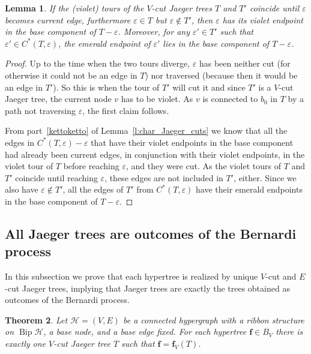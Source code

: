 \documentclass[10pt]{amsart}
\newtheorem{theo}{Theorem}[section]
\newtheorem{lemma}[theo]{Lemma}
\theoremstyle{definition}\newtheorem{defi}[theo]{Definition}
\theoremstyle{remark}\newtheorem{rema}[theo]{Remark}
\newcommand{\HH}{\mathcal H}
\DeclareMathOperator{\bip}{Bip}
\begin{document}
\begin{lemma} \label{l:subs_trees_cuts}
If the (violet) tours of the $V$-cut Jaeger trees $T$ and $T'$ coincide until $\varepsilon$ becomes current edge, furthermore $\varepsilon\in T$ but $\varepsilon\notin T'$, then $\varepsilon$ has its violet endpoint in the base component of $T-\varepsilon$. Moreover, for any $\varepsilon'\in T'$ such that $\varepsilon'\in C^*(T,\varepsilon)$, the emerald endpoint of $\varepsilon'$ lies in the base component of $T-\varepsilon$.	
\end{lemma}

\begin{proof}
Up to the time when the two tours diverge, $\varepsilon$ has been neither cut (for otherwise it could not be an edge in $T$) nor traversed (because then it would be an edge in $T'$). So this is when the tour of $T'$ will cut it and since $T'$ is a $V$-cut Jaeger tree, the current node $v$ has to be violet. As $v$ is connected to $b_0$ in $T$ by a path not traversing $\varepsilon$, the first claim follows.

From part~\ref{kettoketto} of Lemma~\ref{l:char_Jaeger_cuts} we know that all the edges in $C^*(T,\varepsilon)-\varepsilon$ that have their violet endpoints in the base component had already been current edges, in conjunction with their violet endpoints, in the violet tour of $T$ before reaching $\varepsilon$, and they were cut. As the violet tours of $T$ and $T'$ coincide until reaching $\varepsilon$, these edges are not included in $T'$, either. Since we also have $\varepsilon\notin T'$, all the edges of $T'$ from $C^*(T,\varepsilon)$ have their emerald endpoints in the base component of $T-\varepsilon$.
\end{proof}


\subsection{All Jaeger trees are outcomes of the Bernardi process}
\label{ssec:Jaeger->Bernardi}

In this subsection we prove that each hypertree is realized by unique $V$-cut and $E$-cut Jaeger trees, implying that Jaeger trees are exactly the trees obtained as outcomes of the Bernardi process.

\begin{theo}
\label{t:hypertrees_unique_repr_by_J_trees}
Let $\HH=(V,E)$ be a connected hypergraph with a ribbon structure on $\bip\HH$, a base node, and a base edge fixed. For each hypertree $\mathbf f\in B_V$ there is exactly one $V$-cut Jaeger tree $T$ such that $\mathbf f=\mathbf f_V(T)$.
\end{theo}
\end{document}
